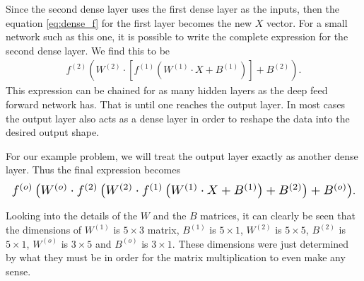 \documentclass[10pt]{amsart}
\begin{document}
\begin{multicols}{2}
  Since the second dense layer uses the first dense layer as the inputs, then
  the equation \ref{eq:dense_f} for the first layer becomes the new $X$ vector.
  For a small network such as this one, it is possible to write the complete
  expression for the second dense layer. We find this to be
  \begin{align*}
    f^{(2)}\left(W^{(2)}\cdot\left[f^{(1)}\left(W^{(1)}\cdot
    X+B^{(1)}\right)\right]+B^{(2)}\right).
  \end{align*}
  This expression can be chained for as many hidden layers as the deep feed
  forward network has. That is until one reaches the output layer. In most
  cases the output layer also acts as a dense layer in order to reshape the
  data into the desired output shape.

  For our example problem, we will treat the output layer exactly as another
  dense layer. Thus the final expression becomes
  \begin{align*}
    \resizebox{\columnwidth}{!}{$
    f^{(o)}\left(W^{(o)}\cdot f^{(2)}\left(W^{(2)}\cdot f^{(1)}\left(
  W^{(1)}\cdot X+B^{(1)}\right)+B^{(2)}\right)+B^{(o)}\right)$}.
  \end{align*}

  Looking into the details of the $W$ and the $B$ matrices, it can clearly be
  seen that the dimensions of $W^{(1)}$ is $5\times 3$ matrix, $B^{(1)}$ is
  $5\times 1$, $W^{(2)}$ is $5\times 5$, $B^{(2)}$ is $5\times 1$, $W^{(o)}$ is
  $3\times 5$ and $B^{(o)}$ is $3\times 1$. These dimensions were just
  determined by what they must be in order for the matrix multiplication to
  even make any sense.


\end{multicols}
\end{document}
